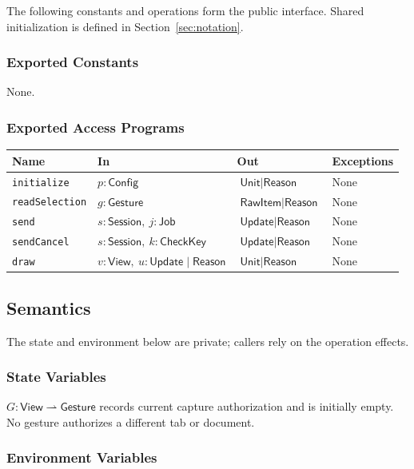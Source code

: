 \documentclass[12pt, titlepage]{article}
\newcommand{\ty}[1]{\textsf{#1}}
\newcommand{\key}{\ty{CheckKey}}
\begin{document}
The following constants and operations form the public interface. Shared initialization is defined in Section~\ref{sec:notation}.

\subsubsection{Exported Constants}

None.

\subsubsection{Exported Access Programs}

\begin{center}
\begin{tabular}{p{3.3cm} p{4cm} p{4cm} p{2.4cm}}
\hline
\textbf{Name} & \textbf{In} & \textbf{Out} & \textbf{Exceptions} \\
\hline
\texttt{initialize} & $p:\ty{Config}$ & $\ty{Unit}\mid\ty{Reason}$ & None \\
\texttt{readSelection} & $g:\ty{Gesture}$ & $\ty{RawItem}\mid\ty{Reason}$ & None \\
\texttt{send} & $s:\ty{Session},\ j:\ty{Job}$ & $\ty{Update}\mid\ty{Reason}$ & None \\
\texttt{sendCancel} & $s:\ty{Session},\ k:\key$ & $\ty{Update}\mid\ty{Reason}$ & None \\
\texttt{draw} & $v:\ty{View},\ u:\ty{Update}\mid\ty{Reason}$ & $\ty{Unit}\mid\ty{Reason}$ & None \\
\hline
\end{tabular}
\end{center}

\subsection{Semantics}

The state and environment below are private; callers rely on the operation effects.

\subsubsection{State Variables}

$G:\ty{View}\rightharpoonup\ty{Gesture}$ records current capture authorization and is initially empty. No gesture authorizes a different tab or document.

\subsubsection{Environment Variables}
\end{document}
